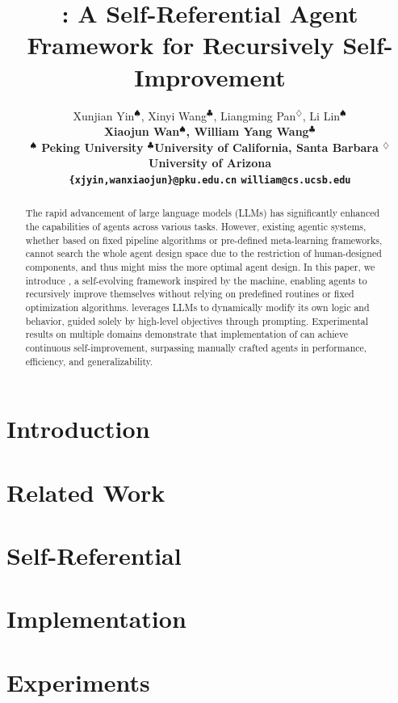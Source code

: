 \documentclass[11pt]{article}
\title{\framework{}: A Self-Referential Agent Framework for Recursively Self-Improvement}
\author{ 
 Xunjian Yin$^{\spadesuit}$\hspace{0.5mm},
 Xinyi Wang$^{\clubsuit}$\hspace{0.5mm},
 Liangming Pan$^{\diamondsuit}$\hspace{0.5mm}, 
 Li Lin$^{\spadesuit}$\hspace{0.5mm}
 \\
 \bf{Xiaojun Wan$^\spadesuit$\hspace{0.5mm},
 William Yang Wang$^\clubsuit$}
\hspace{0.2mm}\hspace{1.5mm} \\
$^\spadesuit$ Peking University \quad$^\clubsuit$University of California, Santa Barbara  \quad $^\diamondsuit$ University of Arizona \\
 \texttt{\{xjyin,wanxiaojun\}@pku.edu.cn} \quad \texttt{william@cs.ucsb.edu} 
}
\begin{document}
\maketitle

\begin{abstract}
The rapid advancement of large language models (LLMs) has significantly enhanced the capabilities of agents across various tasks. However, existing agentic systems, whether based on fixed pipeline algorithms or pre-defined meta-learning frameworks, cannot search the whole agent design space due to the restriction of human-designed components, and thus might miss the more optimal agent design. In this paper, we introduce \framework, a self-evolving framework inspired by the \godel machine, enabling agents to recursively improve themselves without relying on predefined routines or fixed optimization algorithms. \framework leverages LLMs to dynamically modify its own logic and behavior, guided solely by high-level objectives through prompting. Experimental results on multiple domains demonstrate that implementation of \framework can achieve continuous self-improvement, surpassing manually crafted agents in performance, efficiency, and generalizability. 
\end{abstract}

\section{Introduction}


\section{Related Work}


\section{Self-Referential \framework{}}


\section{\framework Implementation}


\section{Experiments}

\end{document}
